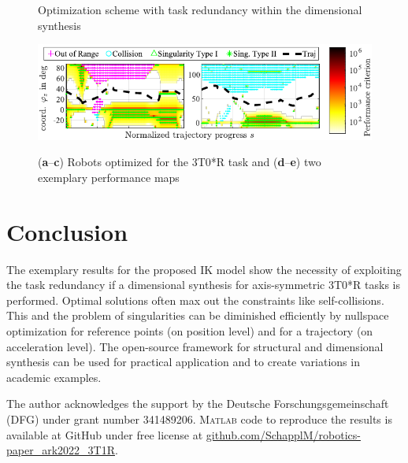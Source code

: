 \documentclass[
	graybox,
	vecphys] %
	{svmult}
\begin{document}

\begin{figure}[tb]
\centering

\caption{Optimization scheme with task redundancy within the dimensional synthesis}
\label{fig:optimization_flowchart_taskred}
\end{figure}



\begin{figure}[b]
\centering

\includegraphics{perfmap_1x2.pdf}
\label{fig:results_all}
\caption{(\textbf{a}--\textbf{c}) Robots optimized for the 3T0*R task and  (\textbf{d}--\textbf{e}) two exemplary performance maps}
\end{figure}


\section{Conclusion}
\label{sec:conclusion}


The exemplary results for the proposed IK model show the necessity of exploiting the task redundancy if a dimensional synthesis for axis-symmetric 3T0*R tasks is performed.
Optimal solutions often max out the constraints like self-collisions.
This and the problem of singularities can be diminished efficiently by nullspace optimization for reference points (on position level) and for a trajectory (on acceleration level).
The open-source framework for structural and dimensional synthesis can be used for practical application and to create variations in academic examples.

\begin{acknowledgement}
\vspace{-0.2cm}
The author acknowledges the support by the Deutsche Forschungsgemeinschaft (DFG) under grant number 341489206. \textsc{Matlab} code to reproduce the results
is available at GitHub under free license at \url{github.com/SchapplM/robotics-paper_ark2022_3T1R}.
%
\end{acknowledgement}

\vspace{-0.4cm}


\end{document}

